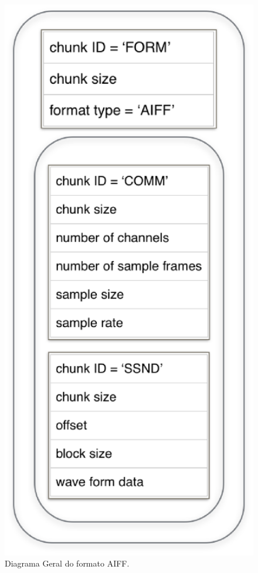 \begin{figure}[ht]
		\includegraphics[keepaspectratio=true,scale=0.5]{figuras/aiff.eps}
	\caption{Diagrama Geral do formato AIFF.}
	\label{aiff}
\end{figure}

